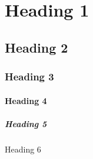 \documentclass{article}
\begin{document}
\section{Heading 1}

\subsection{Heading 2}

\subsubsection{Heading 3}

\paragraph{Heading 4}

\subparagraph{Heading 5}

Heading 6
\end{document}
